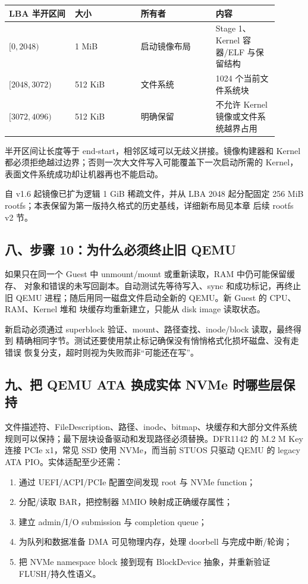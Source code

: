 \begin{longtable}{L{0.22\linewidth}L{0.22\linewidth}L{0.25\linewidth}L{0.21\linewidth}}
\toprule
LBA 半开区间 & 大小 & 所有者 & 内容 \\
\midrule
\([0,2048)\) & 1 MiB & 启动镜像布局 & Stage 1、Kernel 容器/ELF 与保留结构 \\
\([2048,3072)\) & 512 KiB & 文件系统 & 1024 个当前文件系统块 \\
\([3072,4096)\) & 512 KiB & 明确保留 & 不允许 Kernel 镜像或文件系统越界占用 \\
\bottomrule
\end{longtable}

半开区间让长度等于 end-start，相邻区域可以无歧义拼接。镜像构建器和 Kernel
都必须拒绝越过边界；否则一次大文件写入可能覆盖下一次启动所需的 Kernel，
表面文件系统成功却让机器再也不能启动。

自 v1.6 起镜像已扩为逻辑 1 GiB 稀疏文件，并从 LBA 2048 起分配固定
256 MiB rootfs；本表保留为第一版持久格式的历史基线，详细新布局见本章
后续 rootfs v2 节。

\subsection{八、步骤 10：为什么必须终止旧 QEMU}

如果只在同一个 Guest 中 unmount/mount 或重新读取，RAM 中仍可能保留缓存、
对象和错误的未写回副本。自动测试先等待写入、sync 和成功标记，再终止旧 QEMU
进程；随后用同一磁盘文件启动全新的 QEMU。新 Guest 的 CPU、RAM、Kernel 堆和
块缓存均重新建立，只能从 disk image 读取状态。

新启动必须通过 superblock 验证、mount、路径查找、inode/block 读取，最终得到
精确相同字节。测试还要使用禁止标记确保没有悄悄格式化损坏磁盘、没有走错误
恢复分支，超时则视为失败而非“可能还在写”。

\subsection{九、把 QEMU ATA 换成实体 NVMe 时哪些层保持}

文件描述符、FileDescription、路径、inode、bitmap、块缓存和大部分文件系统
规则可以保持；最下层块设备驱动和发现路径必须替换。DFR1142 的 M.2 M Key
连接 PCIe x1，常见 SSD 使用 NVMe，而当前 STUOS 只驱动 QEMU 的 legacy ATA
PIO。实体适配至少还需：

\begin{enumerate}[leftmargin=2.2em]
  \item 通过 UEFI/ACPI/PCIe 配置空间发现 root 与 NVMe function；
  \item 分配/读取 BAR，把控制器 MMIO 映射成正确缓存属性；
  \item 建立 admin/I/O submission 与 completion queue；
  \item 为队列和数据准备 DMA 可见物理内存，处理 doorbell 与完成中断/轮询；
  \item 把 NVMe namespace block 接到现有 BlockDevice 抽象，并重新验证
        FLUSH/持久性语义。
\end{enumerate}

